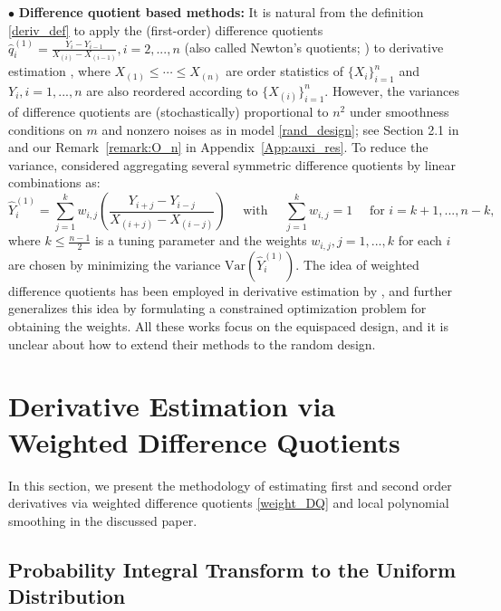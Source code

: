 \documentclass{uwstat572}
\theoremstyle{definition}
\renewcommand{\hat}{\widehat}
\theoremstyle{theorem}
\begin{document}
$\bullet$ {\bf Difference quotient based methods:} It is natural from the definition \eqref{deriv_def} to apply the (first-order) difference quotients $\hat{q}_i^{(1)} = \frac{Y_i - Y_{i-1}}{X_{(i)}- X_{(i-1)}}, i=2,...,n$ (also called Newton's quotients; \citealt{lang1968analysis}) to derivative estimation \citep{muller1987bandwidth,hardle1990applied,charnigo2011generalized}, where $X_{(1)}\leq \cdots \leq X_{(n)}$ are order statistics of $\{X_i\}_{i=1}^n$ and $Y_i,i=1,...,n$ are also reordered according to $\{X_{(i)}\}_{i=1}^n$. However, the variances of difference quotients are (stochastically) proportional to $n^2$ under smoothness conditions on $m$ and nonzero noises as in model \eqref{rand_design}; see Section 2.1 in \cite{de2013derivative} and our Remark~\ref{remark:O_n} in Appendix~\ref{App:auxi_res}. To reduce the variance, \cite{iserles2009first} considered aggregating several symmetric difference quotients by linear combinations as:
\begin{equation}
\label{weight_DQ}
\hat{Y}_i^{(1)} = \sum_{j=1}^k w_{i,j}\left(\frac{Y_{i+j} - Y_{i-j}}{X_{(i+j)} - X_{(i-j)}}\right) \quad \text{ with } \quad \sum_{j=1}^k w_{i,j}=1 \quad \text{ for } i=k+1,...,n-k,
\end{equation}
where $k \leq \frac{n-1}{2}$ is a tuning parameter and the weights $w_{i,j}, j=1,...,k$ for each $i$ are chosen by minimizing the variance $\mathrm{Var}(\hat{Y}_i^{(1)})$. The idea of weighted difference quotients has been employed in derivative estimation by \cite{de2013derivative,wang2015derivative}, and \cite{dai2016optimal} further generalizes this idea by formulating a constrained optimization problem for obtaining the weights. All these works focus on the equispaced design, and it is unclear about how to extend their methods to the random design. 



\section{Derivative Estimation via Weighted Difference Quotients}
\label{Sec:method}

In this section, we present the methodology of estimating first and second order derivatives via weighted difference quotients \eqref{weight_DQ} and local polynomial smoothing in the discussed paper. 

\subsection{Probability Integral Transform to the Uniform Distribution}
\label{Sec:PIT}
\end{document}
